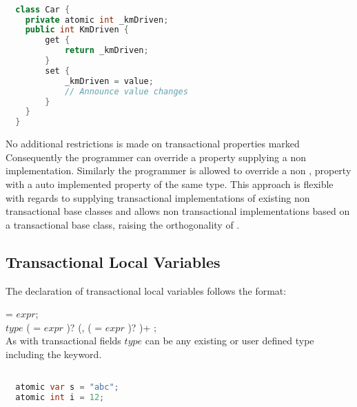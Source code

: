 \begin{lstlisting}[label=lst:atomic_property,
  caption={Manual Transactional Property},
  language=Java,  
  showspaces=false,
  showtabs=false,
  breaklines=true,
  showstringspaces=false,
  breakatwhitespace=true,
  commentstyle=\color{greencomments},
  keywordstyle=\color{bluekeywords},
  stringstyle=\color{redstrings},
  morekeywords={atomic, retry, orElse, var, get, set}]  % Start your code-block

  class Car {
    private atomic int _kmDriven;
    public int KmDriven {
        get {
            return _kmDriven;
        }
        set {
            _kmDriven = value;
            // Announce value changes
        }
    }
  }
\end{lstlisting}

No additional restrictions is made on transactional properties marked  Consequently the programmer can override a  property supplying a non  implementation. Similarly the programmer is allowed to override a non ,  property with a  auto implemented property of the same type. This approach is flexible with regards to supplying transactional implementations of existing non transactional base classes and allows non transactional implementations based on a transactional base class, raising the orthogonality of \stmname.

\subsection{Transactional Local Variables}\label{subsec:local_variables}
The declaration of transactional local variables follows the format:

   = $expr$;\\
 $type$  ( = $expr$ )? (,  ( = $expr$ )? )+ ;\\

As with transactional fields $type$ can be any existing or user defined type including the  keyword.
\begin{lstlisting}[label=lst:local_variable,
  caption={Local Transactional Variable},
  language=Java,  
  showspaces=false,
  showtabs=false,
  breaklines=true,
  showstringspaces=false,
  breakatwhitespace=true,
  commentstyle=\color{greencomments},
  keywordstyle=\color{bluekeywords},
  stringstyle=\color{redstrings},
  morekeywords={atomic, retry, orElse, var, get, set}]  % Start your code-block

  atomic var s = "abc";
  atomic int i = 12;  
\end{lstlisting}


